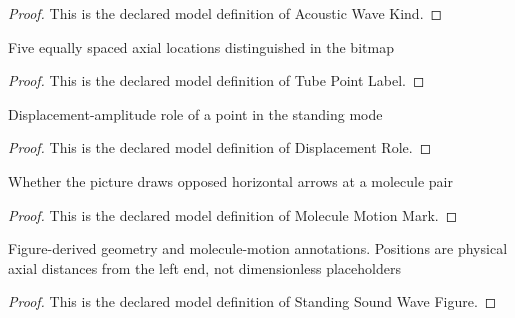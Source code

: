 \begin{proof}
  This is the declared model definition of Acoustic Wave Kind.
\end{proof}
\begin{definition}
  \label{def:physics:phyx-mini-0179:phyxminiproblems-problemphyxmini0179-tubepointlabel}
  Five equally spaced axial locations distinguished in the bitmap
\end{definition}
\begin{proof}
  This is the declared model definition of Tube Point Label.
\end{proof}
\begin{definition}
  \label{def:physics:phyx-mini-0179:phyxminiproblems-problemphyxmini0179-displacementrole}
  Displacement-amplitude role of a point in the standing mode
\end{definition}
\begin{proof}
  This is the declared model definition of Displacement Role.
\end{proof}
\begin{definition}
  \label{def:physics:phyx-mini-0179:phyxminiproblems-problemphyxmini0179-moleculemotionmark}
  Whether the picture draws opposed horizontal arrows at a molecule pair
\end{definition}
\begin{proof}
  This is the declared model definition of Molecule Motion Mark.
\end{proof}
\begin{definition}
  \label{def:physics:phyx-mini-0179:phyxminiproblems-problemphyxmini0179-standingsoundwavefigure}
  Figure-derived geometry and molecule-motion annotations. Positions are physical axial distances from the left end, not dimensionless placeholders
\end{definition}
\begin{proof}
  This is the declared model definition of Standing Sound Wave Figure.
\end{proof}
